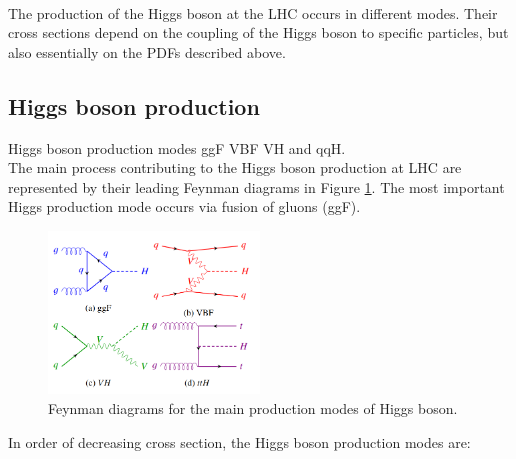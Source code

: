 \\
The production of the Higgs boson at the LHC occurs in different modes. Their cross sections depend on the coupling of the Higgs boson to specific particles, but also essentially on the PDFs described above.
\subsection{Higgs boson production}
\label{chap1:EWSB:HP}
Higgs boson production modes ggF VBF VH and qqH. \\
The main process contributing to the Higgs boson production at LHC are represented by their leading Feynman diagrams in Figure \ref{fig:chap1:EWSB:HP}. The most important Higgs production mode occurs via fusion of gluons (ggF). 
\begin{figure}[ht]
    \centering
    \includegraphics[width=0.5\textwidth]{Ch1/Img/Higgs_prod_modes.png}
    \caption{Feynman diagrams for the main production modes of Higgs boson.}
    \label{fig:chap1:EWSB:HP}
\end{figure}
In order of decreasing cross section, the Higgs boson production modes are:
